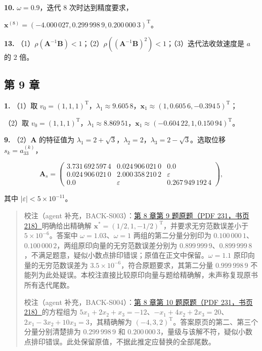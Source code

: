 \textbf{10.} \(\omega=0.9\)，迭代 \(8\) 次时达到精度要求，

\(\boldsymbol{x}^{(8)}=(-4.000\,027,0.299\,998\,9,0.200\,000\,3)^{\mathrm{T}}\)。

\textbf{13.} （1）\(\rho(\boldsymbol{A}^{-1}\boldsymbol{B})<1\)；（2）\(\rho((\boldsymbol{A}^{-1}\boldsymbol{B})^2)<1\)；（3）迭代法收敛速度是 \(a\) 的 \(2\) 倍。

\subsection{第 9 章}\label{back-ux7b2c-9-ux7ae0}

\textbf{1.} （1）取 \(v_0=(1,1,1)^{\mathrm{T}}\)，\(\lambda_1\approx9.605\,8\)，\(\boldsymbol{x}_1\approx(1,0.605\,6,-0.394\,5)^{\mathrm{T}}\)；

（2）取 \(v_0=(1,1,1)^{\mathrm{T}}\)，\(\lambda_1\approx8.869\,51\)，\(\boldsymbol{x}_1\approx(-0.604\,22,1,0.150\,94)^{\mathrm{T}}\)。

\textbf{9.} （2）\(\boldsymbol{A}\) 的特征值为 \(\lambda_1=2+\sqrt{3}\)，\(\lambda_2=2\)，\(\lambda_3=2-\sqrt{3}\)。选取位移 \(s_k=a_{33}^{(k)}\)，

\[
\boldsymbol{A}_s=
\begin{pmatrix}
3.731\,692\,597\,4 & 0.024\,906\,021\,0 & 0.0\\
0.024\,906\,021\,0 & 2.000\,358\,210\,2 & \varepsilon\\
0.0 & \varepsilon & 0.267\,949\,192\,4
\end{pmatrix},
\]

其中 \(|\varepsilon|<5\times10^{-11}\)。

\begin{quote}
校注（agent 补充，BACK-S003）：\href{source-images/pdf-231.jpeg}{第 8 章第 9 题原题（PDF 231，书页 218）}明确给出精确解 \(\boldsymbol{x}^*=(1/2,1,-1/2)^{\mathrm{T}}\)，并要求无穷范数误差小于 \(5\times10^{-6}\)。答案中 \(\omega=1.03\)、\(\omega=1\) 两组的第二分量分别印为 \(0.100\,000\,1\)、\(0.100\,000\,2\)，两组原印向量的无穷范数误差分别为 \(0.899\,999\,9\)、\(0.899\,999\,8\)，不满足题意，疑似小数点排印错误；原值在正文中保留。\(\omega=1.1\) 原印向量的无穷范数误差为 \(3.5\times10^{-6}\)，符合原题要求，其第二分量 \(0.999\,998\,9\) 不能列为此处疑误。本校注直接比较原印向量与题给精确解，未声称复现原书所有迭代尾数。

校注（agent 补充，BACK-S004）：\href{source-images/pdf-231.jpeg}{第 8 章第 10 题原题（PDF 231，书页 218）}的方程组为 \(5x_1+2x_2+x_3=-12\)、\(-x_1+4x_2+2x_3=20\)、\(2x_1-3x_2+10x_3=3\)，其精确解为 \((-4,3,2)^{\mathrm{T}}\)。答案原页的第二、第三个分量分别清楚排为 \(0.299\,998\,9\) 和 \(0.200\,000\,3\)，量级与该解不符，疑似小数点排印错误。此处保留原值，不据此推定应替换的全部尾数。
\end{quote}

